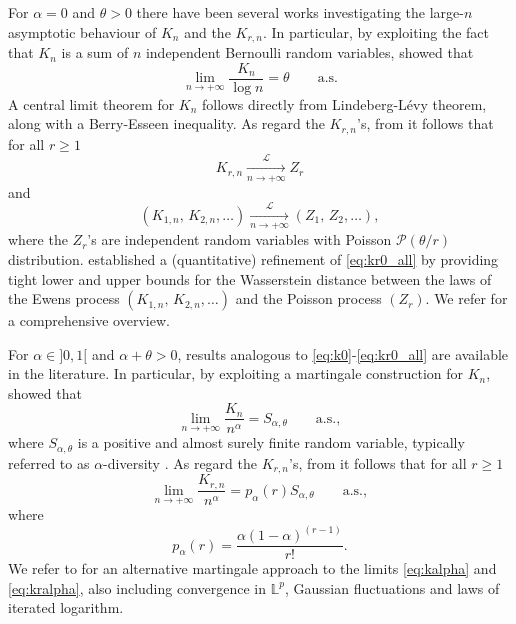 \documentclass[twoside,12pt]{article}
\newcommand{\cP}{\mathcal{P}}
\newcommand{\cL}{\mathcal{L}}
\begin{document}
For $\alpha=0$ and $\theta>0$ there have been several works investigating the large-$n$ asymptotic behaviour of $K_{n}$ and the $K_{r,n}$. In particular, by exploiting the fact that $K_{n}$ is a sum of $n$ independent Bernoulli random variables, \citet[Theorem 2.3]{Kor(73)} showed that
\begin{equation}\label{eq:k0}
\lim_{n\rightarrow+\infty}\frac{K_{n}}{\log n}=\theta\qquad\text{a.s.}
\end{equation}
A central limit theorem for $K_{n}$ follows directly from Lindeberg-L\'evy theorem, along with a Berry-Esseen inequality. As regard the $K_{r,n}$'s, from \citet[Theorem 1]{Arr(92)} it follows that for all $r\geq1$
\begin{equation}\label{eq:kr0}
K_{r,n}\underset{n\rightarrow+\infty}{\overset{\cL}{\longrightarrow}}Z_{r}
\end{equation}
and
\begin{equation}\label{eq:kr0_all}
(K_{1,n},\,K_{2,n},\ldots)\underset{n\rightarrow+\infty}{\overset{\cL}{\longrightarrow}}(Z_{1},\,Z_{2},\ldots),
\end{equation}
where the $Z_{r}$'s are independent random variables with Poisson $\cP(\theta/r)$ distribution. \citet{Bar(92)} established a (quantitative) refinement  of \eqref{eq:kr0_all}  by providing tight lower and upper bounds for the Wasserstein distance between the laws of the Ewens process $(K_{1,n},\,K_{2,n},\ldots)$ and the Poisson process $(Z_{r})$. We refer \citet[Chapter 4]{Arr(03)} for a comprehensive overview.

For $\alpha\in]0,1[$ and $\alpha+ \theta>0$, results analogous to \eqref{eq:k0}-\eqref{eq:kr0_all} are available in the literature. In particular, by exploiting a martingale construction for $K_{n}$, \citet[Theorem 3.8]{Pit(06)} showed that
\begin{equation}\label{eq:kalpha}
\lim_{n\rightarrow+\infty}\frac{K_{n}}{n^{\alpha}}=S_{\alpha,\theta}\qquad\text{a.s.},
\end{equation}
where $S_{\alpha,\theta}$ is a positive and almost surely finite random variable, typically referred to as $\alpha$-diversity \citep{Pit(03)}. As regard the $K_{r,n}$'s, from \citet[Lemma 1.1]{Pit(06)} it follows that for all $r\geq1$
\begin{equation}\label{eq:kralpha}
\lim_{n\rightarrow+\infty}\frac{K_{r,n}}{n^{\alpha}}=p_{\alpha}(r) S_{\alpha,\theta}\qquad\text{a.s.},
\end{equation}
where
\begin{equation}
\label{Sibuya}
p_{\alpha}(r)=\frac{\alpha(1-\alpha)^{(r-1)}}{r!}.
\end{equation}
We refer to \citet{Ber(24)} for an alternative martingale approach to the limits \eqref{eq:kalpha} and \eqref{eq:kralpha}, also including convergence in $\mathbb{L}^{p}$, Gaussian fluctuations and laws of iterated logarithm.
\end{document}
